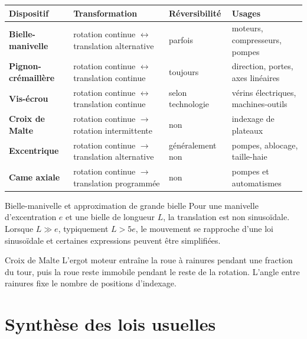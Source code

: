 \begin{center}
\small
\begin{tabularx}{\linewidth}{>{\bfseries}p{3cm}p{3.5cm}p{2.2cm}X}
\toprule
Dispositif & Transformation & Réversibilité & Usages \\
\midrule
Bielle-manivelle & rotation continue $\leftrightarrow$ translation alternative & parfois & moteurs, compresseurs, pompes \\
Pignon-crémaillère & rotation continue $\leftrightarrow$ translation continue & toujours & direction, portes, axes linéaires \\
Vis-écrou & rotation continue $\leftrightarrow$ translation continue & selon technologie & vérins électriques, machines-outils \\
Croix de Malte & rotation continue $\rightarrow$ rotation intermittente & non & indexage de plateaux \\
Excentrique & rotation continue $\rightarrow$ translation alternative & généralement non & pompes, ablocage, taille-haie \\
Came axiale & rotation continue $\rightarrow$ translation programmée & non & pompes et automatismes \\
\bottomrule
\end{tabularx}
\end{center}

\begin{TLThreeDef}{Bielle-manivelle et approximation de grande bielle}
Pour une manivelle d'excentration $e$ et une bielle de longueur $L$, la
translation est non sinusoïdale. Lorsque $L\gg e$, typiquement
$L>5e$, le mouvement se rapproche d'une loi sinusoïdale et certaines
expressions peuvent être simplifiées.
\end{TLThreeDef}

\begin{TLThreeDef}{Croix de Malte}
L'ergot moteur entraîne la roue à rainures pendant une fraction du tour,
puis la roue reste immobile pendant le reste de la rotation. L'angle
entre rainures fixe le nombre de positions d'indexage.
\end{TLThreeDef}

\section{Synthèse des lois usuelles}
\label{sec:trans-synthese}

